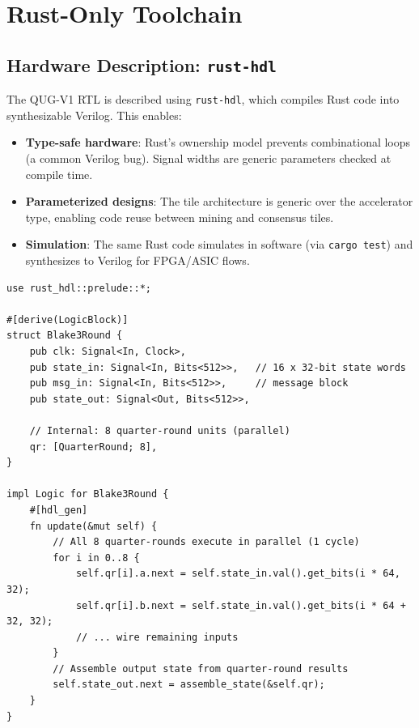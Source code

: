 \documentclass[11pt,a4paper]{article}
\begin{document}
\section{Rust-Only Toolchain}
\label{sec:toolchain}

\subsection{Hardware Description: \texttt{rust-hdl}}

The QUG-V1 RTL is described using \texttt{rust-hdl}, which compiles Rust code into synthesizable Verilog. This enables:

\begin{itemize}
    \item \textbf{Type-safe hardware}: Rust's ownership model prevents combinational loops (a common Verilog bug). Signal widths are generic parameters checked at compile time.
    \item \textbf{Parameterized designs}: The tile architecture is generic over the accelerator type, enabling code reuse between mining and consensus tiles.
    \item \textbf{Simulation}: The same Rust code simulates in software (via \texttt{cargo test}) and synthesizes to Verilog for FPGA/ASIC flows.
\end{itemize}

\begin{lstlisting}[style=rust,caption={BLAKE3 Round Unit in \texttt{rust-hdl}}]
use rust_hdl::prelude::*;

#[derive(LogicBlock)]
struct Blake3Round {
    pub clk: Signal<In, Clock>,
    pub state_in: Signal<In, Bits<512>>,   // 16 x 32-bit state words
    pub msg_in: Signal<In, Bits<512>>,     // message block
    pub state_out: Signal<Out, Bits<512>>,

    // Internal: 8 quarter-round units (parallel)
    qr: [QuarterRound; 8],
}

impl Logic for Blake3Round {
    #[hdl_gen]
    fn update(&mut self) {
        // All 8 quarter-rounds execute in parallel (1 cycle)
        for i in 0..8 {
            self.qr[i].a.next = self.state_in.val().get_bits(i * 64, 32);
            self.qr[i].b.next = self.state_in.val().get_bits(i * 64 + 32, 32);
            // ... wire remaining inputs
        }
        // Assemble output state from quarter-round results
        self.state_out.next = assemble_state(&self.qr);
    }
}
\end{lstlisting}
\end{document}
